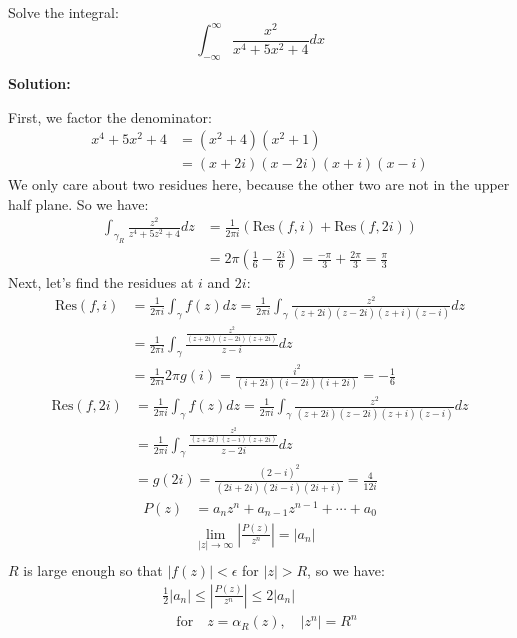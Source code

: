 \begin{example}
    Solve the integral:
    $$\int_{-\infty}^{\infty} \frac{x^2}{x^4 + 5x^2 + 4} dx$$

    \textbf{Solution:}

    First, we factor the denominator:
    \begin{align*}
        x^4 + 5x^2 + 4 & = (x^2 + 4)(x^2 + 1)             \\
                       & = (x + 2i)(x - 2i)(x + i)(x - i)
    \end{align*}
    We only care about two residues here, because the other two are not in the upper half plane. So we have:
    \begin{align*}
        \int_{\gamma_R}\frac{z^2}{z^4 + 5z^2 + 4} dz & = \frac{1}{2\pi i}(\text{Res}(f, i) + \text{Res}(f, 2i))                              \\
                                                     & = 2\pi (\frac{1}{6} - \frac{2i}{6}) = \frac{-\pi}{3} + \frac{2\pi}{3} = \frac{\pi}{3}
    \end{align*}
    Next, let's find the residues at $i$ and $2i$:
    \begin{align*}
        \text{Res}(f, i) & = \frac{1}{2\pi i}\int_{\gamma} f(z) dz = \frac{1}{2\pi i}\int_{\gamma} \frac{z^2}{(z + 2i)(z - 2i)(z + i)(z - i)} dz \\
                         & = \frac{1}{2\pi i}\int_{\gamma} \frac{\frac{z^2}{(z + 2i)(z - 2i)(z+2i)}}{z-i}dz                                      \\
                         & = \frac{1}{2\pi i}2\pi g(i) = \frac{i^2}{(i + 2i)(i - 2i)(i + 2i)} = -\frac{1}{6}
    \end{align*}
    \begin{align*}
        \text{Res}(f, 2i) & = \frac{1}{2\pi i}\int_{\gamma} f(z) dz = \frac{1}{2\pi i}\int_{\gamma} \frac{z^2}{(z + 2i)(z - 2i)(z + i)(z - i)} dz \\
                          & = \frac{1}{2\pi i}\int_{\gamma} \frac{\frac{z^2}{(z + 2i)(z - i)(z+2i)}}{z-2i}dz                                      \\
                          & = g(2 i)  = \frac{(2 - i)^2}{(2i + 2i)(2i - i)(2i + i)} = \frac{4}{12i}
    \end{align*}
    \begin{align*}
        P(z) & = a_nz^n + a_{n-1}z^{n-1} + \cdots + a_0                      \\
             & \lim_{|z| \to \infty} \left| \frac{P(z)}{z^n} \right| = |a_n| \\
    \end{align*}
    $R$ is large enough so that $|f(z)| < \epsilon$ for $|z| > R$, so we have:
    \begin{align*}
        \frac{1}{2} |a_n| \leq \left|\frac{P(z)}{z^n}\right| \leq 2|a_n| \\ \quad \text{for} \quad z = \alpha_R (z), \quad |z^n| = R^n \\
    \end{align*}


\end{example}
